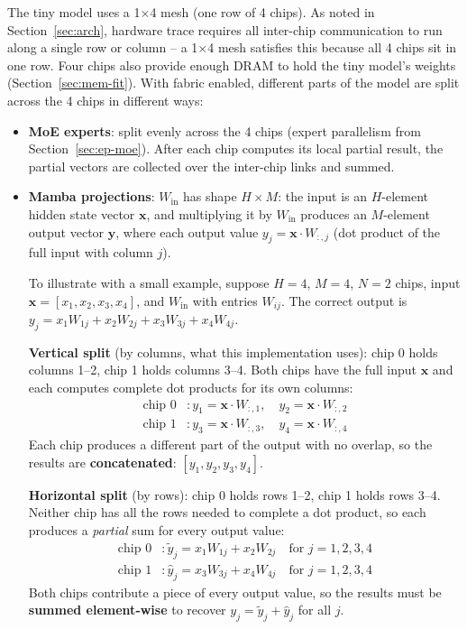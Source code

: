 The tiny model uses a 1$\times$4 mesh (one row of 4 chips). As noted in Section~\ref{sec:arch}, hardware trace requires all inter-chip communication to run along a single row or column -- a 1$\times$4 mesh satisfies this because all 4 chips sit in one row. Four chips also provide enough DRAM to hold the tiny model's weights (Section~\ref{sec:mem-fit}). With fabric enabled, different parts of the model are split across the 4 chips in different ways:
\begin{itemize}
\item \textbf{MoE experts}: split evenly across the 4 chips (expert parallelism from Section~\ref{sec:ep-moe}). After each chip computes its local partial result, the partial vectors are collected over the inter-chip links and summed.
\item \textbf{Mamba projections}: $W_{\mathrm{in}}$ has shape $H \times M$: the input is an $H$-element hidden state vector $\mathbf{x}$, and multiplying it by $W_{\mathrm{in}}$ produces an $M$-element output vector $\mathbf{y}$, where each output value $y_j = \mathbf{x} \cdot W_{:,j}$ (dot product of the full input with column $j$).

  To illustrate with a small example, suppose $H{=}4$, $M{=}4$, $N{=}2$ chips, input $\mathbf{x} = [x_1, x_2, x_3, x_4]$, and $W_{\mathrm{in}}$ with entries $W_{ij}$. The correct output is $y_j = x_1 W_{1j} + x_2 W_{2j} + x_3 W_{3j} + x_4 W_{4j}$.

  \textbf{Vertical split} (by columns, what this implementation uses): chip 0 holds columns 1--2, chip 1 holds columns 3--4. Both chips have the full input $\mathbf{x}$ and each computes complete dot products for its own columns:
  \begin{align*}
    \text{chip 0} &: y_1 = \mathbf{x} \cdot W_{:,1},\quad y_2 = \mathbf{x} \cdot W_{:,2} \\
    \text{chip 1} &: y_3 = \mathbf{x} \cdot W_{:,3},\quad y_4 = \mathbf{x} \cdot W_{:,4}
  \end{align*}
  Each chip produces a different part of the output with no overlap, so the results are \textbf{concatenated}: $[y_1, y_2, y_3, y_4]$.

  \textbf{Horizontal split} (by rows): chip 0 holds rows 1--2, chip 1 holds rows 3--4. Neither chip has all the rows needed to complete a dot product, so each produces a \emph{partial} sum for every output value:
  \begin{align*}
    \text{chip 0} &: \tilde{y}_j = x_1 W_{1j} + x_2 W_{2j} \quad \text{for } j = 1,2,3,4 \\
    \text{chip 1} &: \hat{y}_j = x_3 W_{3j} + x_4 W_{4j} \quad \text{for } j = 1,2,3,4
  \end{align*}
  Both chips contribute a piece of every output value, so the results must be \textbf{summed element-wise} to recover $y_j = \tilde{y}_j + \hat{y}_j$ for all $j$.


\end{itemize}
